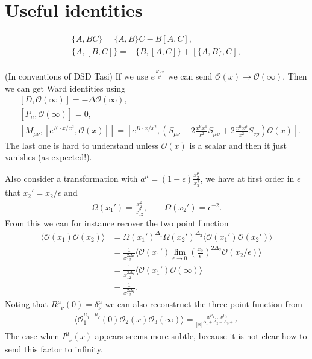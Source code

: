 \documentclass[letterpaper]{article}
\let\Oldsection\section
\renewcommand{\section}{\FloatBarrier\Oldsection}
\def\Om{{\mathcal{O}}}
\def\ph{\phantom}
\def \ph{\phantom}
\begin{document}
\section{Useful identities}

\begin{align}
 \{ A, B C \} = \{ A, B \} C - B [A, C], \\
 \{ A, [B, C] \} = - \{ B, [A, C] \}  + [ \{A, B \}, C], \\
\end{align}

(In conventions of DSD Tasi) If we use $e^{\frac{K \cdot x}{x^2}}$ we can send $\Om(x) \to \Om(\infty)$. Then we can get Ward identities using
\begin{align}
 & [D, \Om(\infty)] = -\Delta \Om(\infty), \\
 & [P_\mu, \Om(\infty)] = 0, \\
 & [M_{\mu\nu}, [e^{K\cdot x/x^2}, \Om(x)]] 
 = \left[ e^{K\cdot x/x^2}, \left(
    S_{\mu\nu} 
    - 2 \frac{x^\nu x^\rho}{x^2} S_{\mu\rho}
    + 2 \frac{x^\mu x^\rho}{x^2} S_{\nu\rho}
 \right) \Om(x) \right].
\end{align}
The last one is hard to understand unless $\Om(x)$ is a scalar and then it just vanishes (as expected!).

Also consider a transformation with $a^\mu = (1-\epsilon) \frac{x_2^\mu}{x_2^2}$, we have at first order in $\epsilon$ that $x_2' = x_2 / \epsilon$ and
\begin{align}
 \Omega(x_1') = \frac{x_2^2}{x_{12}^2}, \qquad
 \Omega(x_2') = \epsilon^{-2}.
\end{align}
From this we can for instance recover the two point function
\begin{align}
 \langle \Om(x_1) \Om(x_2) \rangle
 & = \Omega(x_1')^{\Delta_1} \Omega(x_2')^{\Delta_2} \langle \Om(x_1') \Om(x_2') \rangle \\
 & = \frac{1}{x_{12}^{2\Delta_1}} \langle \Om(x_1') 
     \lim_{\epsilon\to0} \left( \frac{x_2}{\epsilon}\right)^{2\Delta_2} \Om(x_2/\epsilon) 
     \rangle \\
 & = \frac{1}{x_{12}^{2\Delta_1}} \langle \Om(x_1') \Om(\infty) \rangle \\
 & = \frac{1}{x_{12}^{2\Delta_1}}.
\end{align}
Noting that $R^\mu_{\ph \mu\nu}(0) = \delta^\mu_\nu$ we can also reconstruct the three-point function from
\begin{align}
 \langle \Om_1^{\mu_1 \ldots \mu_\ell}(0) \Om_2(x) \Om_3(\infty) \rangle
 = \frac{x^{\mu_1} \ldots x^{\mu_\ell} }{|x|^{\Delta_1 + \Delta_2 - \Delta_3 + \ell}}
\end{align}
The case when $I^\mu_{\ph \mu\nu}(x)$ appears seems more subtle, because it is not clear how to send this factor to infinity.
\end{document}
